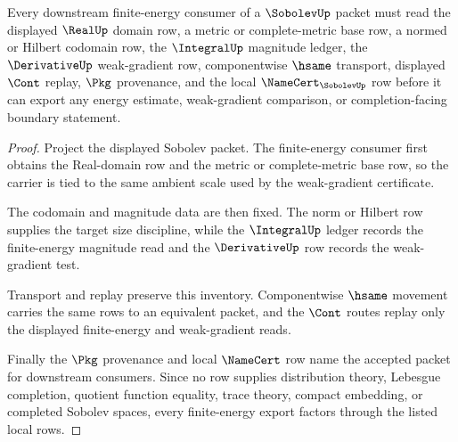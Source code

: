 
\begin{theorem}
\label{thm:sobolev-mature-finite-energy-consumer}
Every downstream finite-energy consumer of a $\SobolevUp$ packet must read the displayed $\RealUp$ domain row, a metric or complete-metric base row, a normed or Hilbert codomain row, the $\IntegralUp$ magnitude ledger, the $\DerivativeUp$ weak-gradient row, componentwise $\hsame$ transport, displayed $\Cont$ replay, $\Pkg$ provenance, and the local $\NameCert_{\SobolevUp}$ row before it can export any energy estimate, weak-gradient comparison, or completion-facing boundary statement.
\end{theorem}
\begin{proof}
Project the displayed Sobolev packet. The finite-energy consumer first obtains the Real-domain row and the metric or complete-metric base row, so the carrier is tied to the same ambient scale used by the weak-gradient certificate.

The codomain and magnitude data are then fixed. The norm or Hilbert row supplies the target size discipline, while the $\IntegralUp$ ledger records the finite-energy magnitude read and the $\DerivativeUp$ row records the weak-gradient test.

Transport and replay preserve this inventory. Componentwise $\hsame$ movement carries the same rows to an equivalent packet, and the $\Cont$ routes replay only the displayed finite-energy and weak-gradient reads.

Finally the $\Pkg$ provenance and local $\NameCert$ row name the accepted packet for downstream consumers. Since no row supplies distribution theory, Lebesgue completion, quotient function equality, trace theory, compact embedding, or completed Sobolev spaces, every finite-energy export factors through the listed local rows.
\end{proof}

